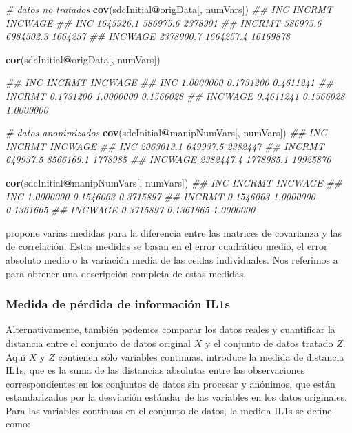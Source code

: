 \documentclass[]{book}
\newenvironment{Shaded}{\begin{snugshade}}{\end{snugshade}}
\newcommand{\CommentTok}[1]{\textcolor[rgb]{0.56,0.35,0.01}{\textit{#1}}}
\newcommand{\KeywordTok}[1]{\textcolor[rgb]{0.13,0.29,0.53}{\textbf{#1}}}
\newcommand{\NormalTok}[1]{#1}
\newcommand{\OperatorTok}[1]{\textcolor[rgb]{0.81,0.36,0.00}{\textbf{#1}}}
\theoremstyle{definition}
\theoremstyle{definition}
\theoremstyle{definition}
\theoremstyle{definition}
\theoremstyle{remark}
\begin{document}
\begin{Shaded}
\begin{Highlighting}[]
\CommentTok{# datos no tratados}
\KeywordTok{cov}\NormalTok{(sdcInitial}\OperatorTok{@}\NormalTok{origData[, numVars])}
\CommentTok{##               INC    INCRMT  INCWAGE}
\CommentTok{## INC     1645926.1  586975.6  2378901}
\CommentTok{## INCRMT   586975.6 6984502.3  1664257}
\CommentTok{## INCWAGE 2378900.7 1664257.4 16169878}

\KeywordTok{cor}\NormalTok{(sdcInitial}\OperatorTok{@}\NormalTok{origData[, numVars])}

\CommentTok{##               INC    INCRMT   INCWAGE}
\CommentTok{## INC     1.0000000 0.1731200 0.4611241}
\CommentTok{## INCRMT  0.1731200 1.0000000 0.1566028}
\CommentTok{## INCWAGE 0.4611241 0.1566028 1.0000000}

\CommentTok{# datos anonimizados}
\KeywordTok{cov}\NormalTok{(sdcInitial}\OperatorTok{@}\NormalTok{manipNumVars[, numVars])}
\CommentTok{##               INC    INCRMT  INCWAGE}
\CommentTok{## INC     2063013.1  649937.5  2382447}
\CommentTok{## INCRMT   649937.5 8566169.1  1778985}
\CommentTok{## INCWAGE 2382447.4 1778985.1 19925870}

\KeywordTok{cor}\NormalTok{(sdcInitial}\OperatorTok{@}\NormalTok{manipNumVars[, numVars])}
\CommentTok{##               INC    INCRMT   INCWAGE}
\CommentTok{## INC     1.0000000 0.1546063 0.3715897}
\CommentTok{## INCRMT  0.1546063 1.0000000 0.1361665}
\CommentTok{## INCWAGE 0.3715897 0.1361665 1.0000000}
\end{Highlighting}
\end{Shaded}

\citep{domingo-ferrer2001} propone varias medidas para la diferencia entre las matrices de covarianza y las de correlación. Estas medidas se basan en el error cuadrático medio, el error absoluto medio o la variación media de las celdas individuales. Nos referimos a \citep{domingo-ferrer2001} para obtener una descripción completa de estas medidas.

\hypertarget{medida-de-puxe9rdida-de-informaciuxf3n-il1s}{%
\subsubsection{Medida de pérdida de información IL1s}\label{medida-de-puxe9rdida-de-informaciuxf3n-il1s}}

Alternativamente, también podemos comparar los datos reales y cuantificar la distancia entre el conjunto de datos original \(X\) y el conjunto de datos tratado \(Z\). Aquí \(X\) y \(Z\) contienen sólo variables continuas. \citep{yancey2002} introduce la medida de distancia IL1s, que es la suma de las distancias absolutas entre las observaciones correspondientes en los conjuntos de datos sin procesar y anónimos, que están estandarizados por la desviación estándar de las variables en los datos originales. Para las variables continuas en el conjunto de datos,
la medida IL1s se define como:
\end{document}
